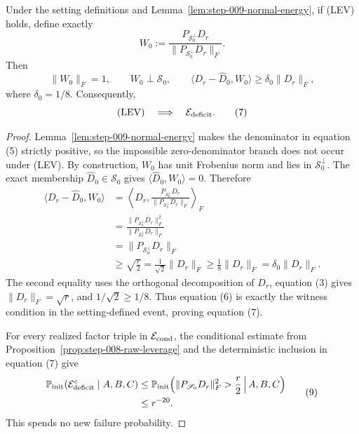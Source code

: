 \begin{proposition}
\label{prop:step-009-raw-witness}
Under the setting definitions and
Lemma~\ref{lem:step-009-normal-energy}, if (LEV) holds, define exactly
\[
  W_0:=\frac{P_{\mathscr S_0^\perp}D_r}
  {\|P_{\mathscr S_0^\perp}D_r\|_F}.
  \tag{5}
\]
Then
\[
  \|W_0\|_F=1,
  \qquad
  W_0\perp\mathscr S_0,
  \qquad
  \langle D_r-\widehat D_0,W_0\rangle
  \ge\delta_0\|D_r\|_F,
  \tag{6}
\]
where \(\delta_0=1/8\). Consequently,
\[
  (\mathrm{LEV})\quad\Longrightarrow\quad
  \mathcal E_{\rm deficit}.
  \tag{7}
\]

\end{proposition}

\begin{proof}
Lemma~\ref{lem:step-009-normal-energy} makes the
denominator in equation (5) strictly positive, so the impossible
zero-denominator branch does not occur under (LEV). By construction,
\(W_0\) has unit Frobenius norm and lies in \(\mathscr S_0^\perp\).
The exact membership \(\widehat D_0\in\mathscr S_0\) gives
\(\langle\widehat D_0,W_0\rangle=0\). Therefore
\[
\begin{aligned}
  \langle D_r-\widehat D_0,W_0\rangle
  &=\left\langle D_r,
    \frac{P_{\mathscr S_0^\perp}D_r}
    {\|P_{\mathscr S_0^\perp}D_r\|_F}\right\rangle_F\\
  &=\frac{\|P_{\mathscr S_0^\perp}D_r\|_F^2}
    {\|P_{\mathscr S_0^\perp}D_r\|_F}\\
  &=\|P_{\mathscr S_0^\perp}D_r\|_F\\
  &\ge\sqrt{\frac r2}
   =\frac1{\sqrt2}\|D_r\|_F
   \ge\frac18\|D_r\|_F
   =\delta_0\|D_r\|_F.
\end{aligned}\tag{8}
\]
The second equality uses the orthogonal decomposition of \(D_r\), equation
(3) gives \(\|D_r\|_F=\sqrt r\), and
\(1/\sqrt2\ge1/8\). Thus equation (6) is exactly the witness condition in
the setting-defined event, proving equation (7). 

For every realized factor triple in \(\mathcal E_{\rm cond}\), the conditional estimate from Proposition~\ref{prop:step-008-raw-leverage} and the deterministic inclusion in
equation (7) give
\[
\begin{aligned}
  \mathbb P_{\rm init}(\mathcal E_{\rm deficit}^{c}\mid A,B,C)
  &\le
  \mathbb P_{\rm init}\!\left(
    \|P_{\mathscr S_0}D_r\|_F^2>\frac r2\,\middle|\,A,B,C
  \right)\\
  &\le r^{-20}.
\end{aligned}\tag{9}
\]
This spends no new failure probability.

\end{proof}

